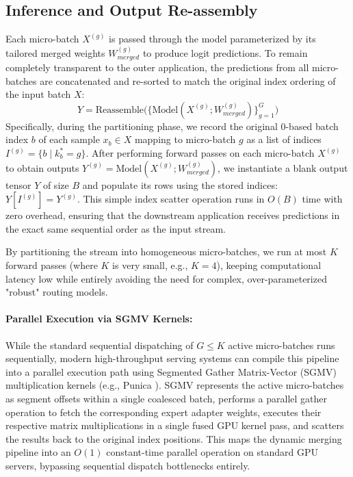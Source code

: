 \subsection{Inference and Output Re-assembly}
Each micro-batch $X^{(g)}$ is passed through the model parameterized by its tailored merged weights $W_{merged}^{(g)}$ to produce logit predictions. To remain completely transparent to the outer application, the predictions from all micro-batches are concatenated and re-sorted to match the original index ordering of the input batch $X$:
\begin{equation}
Y = \text{Reassemble}\Big( \big\{ \text{Model}(X^{(g)}; W_{merged}^{(g)}) \big\}_{g=1}^G \Big)
\label{eq:reassemble}
\end{equation}
Specifically, during the partitioning phase, we record the original 0-based batch index $b$ of each sample $x_b \in X$ mapping to micro-batch $g$ as a list of indices $I^{(g)} = \{b \mid k_b^* = g\}$. After performing forward passes on each micro-batch $X^{(g)}$ to obtain outputs $Y^{(g)} = \text{Model}(X^{(g)}; W_{merged}^{(g)})$, we instantiate a blank output tensor $Y$ of size $B$ and populate its rows using the stored indices: $Y[I^{(g)}] = Y^{(g)}$. This simple index scatter operation runs in $O(B)$ time with zero overhead, ensuring that the downstream application receives predictions in the exact same sequential order as the input stream.

By partitioning the stream into homogeneous micro-batches, we run at most $K$ forward passes (where $K$ is very small, e.g., $K=4$), keeping computational latency low while entirely avoiding the need for complex, over-parameterized "robust" routing models.

\paragraph{Parallel Execution via SGMV Kernels:}
While the standard sequential dispatching of $G \le K$ active micro-batches runs sequentially, modern high-throughput serving systems can compile this pipeline into a parallel execution path using Segmented Gather Matrix-Vector (SGMV) multiplication kernels (e.g., Punica \cite{Punica2023}). SGMV represents the active micro-batches as segment offsets within a single coalesced batch, performs a parallel gather operation to fetch the corresponding expert adapter weights, executes their respective matrix multiplications in a single fused GPU kernel pass, and scatters the results back to the original index positions. This maps the dynamic merging pipeline into an $O(1)$ constant-time parallel operation on standard GPU servers, bypassing sequential dispatch bottlenecks entirely.

